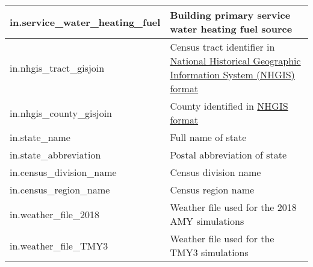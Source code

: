 \begin{center}
\begin{longtable}{|p{3in}|p{3in}|}
in.service\_water\_heating\_fuel                                                 & Building primary service water heating fuel source                                                                                                                   \\ \hline
in.nhgis\_tract\_gisjoin                                                         & Census tract identifier in \href{https://www.nhgis.org/geographic-crosswalks\#details}{National Historical Geographic Information System (NHGIS) format}                                                                 \\ \hline
in.nhgis\_county\_gisjoin                                                        & County identified in \href{https://www.nhgis.org/geographic-crosswalks\#details}{NHGIS format}                                                                       \\ \hline
in.state\_name                                                                   & Full name of state                                                                                                                                                   \\ \hline
in.state\_abbreviation                                                           & Postal abbreviation of state                                                                                                                                         \\ \hline
in.census\_division\_name                                                        & Census division name                                                                                                                                                 \\ \hline
in.census\_region\_name                                                          & Census region name                                                                                                                                                   \\ \hline
in.weather\_file\_2018                                                           & Weather file used for the 2018 AMY simulations                                                                                                                       \\ \hline
in.weather\_file\_TMY3                                                           & Weather file used for the TMY3 simulations                                                                                                                           \\ \hline

\end{longtable}
\end{center}
